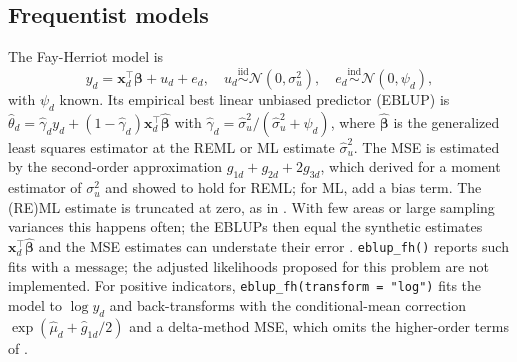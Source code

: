 \subsection{Frequentist models}\label{sec:methods-freq}

The Fay-Herriot model \citep{fay1979estimates} is
\begin{equation}
y_d = \boldsymbol{x}_d^\top \boldsymbol{\beta} + u_d + e_d, \quad u_d \overset{\mathrm{iid}}{\sim} \mathcal{N}(0, \sigma_u^2), \quad e_d \overset{\mathrm{ind}}{\sim} \mathcal{N}(0, \psi_d),
\label{eq:fh}
\end{equation}
with \(\psi_d\) known. Its empirical best linear unbiased predictor (EBLUP) is \(\hat{\theta}_d = \hat{\gamma}_d y_d + (1 - \hat{\gamma}_d)\boldsymbol{x}_d^\top\hat{\boldsymbol{\beta}}\) with \(\hat{\gamma}_d = \hat{\sigma}_u^2 / (\hat{\sigma}_u^2 + \psi_d)\), where \(\hat{\boldsymbol{\beta}}\) is the generalized least squares estimator at the REML or ML estimate \(\hat{\sigma}_u^2\). The MSE is estimated by the second-order approximation \(g_{1d} + g_{2d} + 2g_{3d}\), which \citet{prasad1990estimation} derived for a moment estimator of \(\sigma_u^2\) and \citet{datta2000unified} showed to hold for REML; for ML, \citet{datta2000unified} add a bias term. The (RE)ML estimate is truncated at zero, as in . With few areas or large sampling variances this happens often; the EBLUPs then equal the synthetic estimates \(\boldsymbol{x}_d^\top\hat{\boldsymbol{\beta}}\) and the MSE estimates can understate their error \citep{li2010adjusted}. \texttt{eblup\_fh()} reports such fits with a message; the adjusted likelihoods proposed for this problem \citep{li2010adjusted, yoshimori2014new} are not implemented. For positive indicators, \texttt{eblup\_fh(transform\ =\ "log")} fits the model to \(\log y_d\) and back-transforms with the conditional-mean correction \(\exp(\hat{\mu}_d + \hat{g}_{1d}/2)\) and a delta-method MSE, which omits the higher-order terms of \citet{slud2006mean}.

